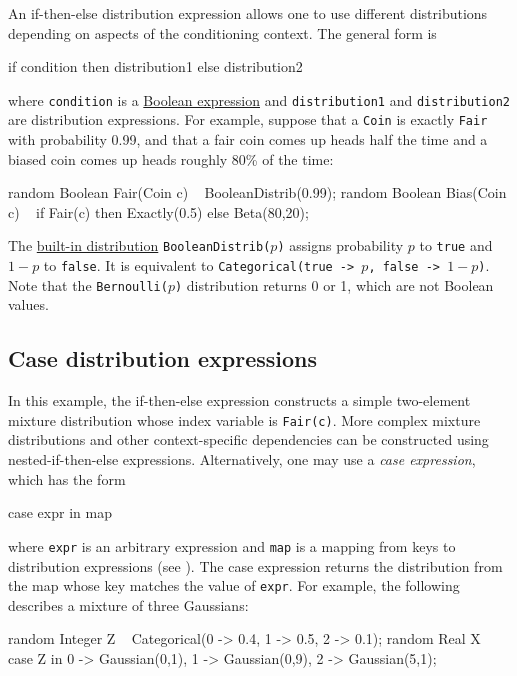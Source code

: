 \documentclass[12pt]{article}
\begin{document}
An if-then-else distribution expression allows one to use different distributions depending on aspects of the conditioning context.
The general form is
\begin{blogcode}
if condition then distribution1 else distribution2
\end{blogcode}
where \texttt{condition} is a \hyperref[Boolean-expression-section]{Boolean expression} and \texttt{distribution1} and \texttt{distribution2}
are distribution expressions. For example, suppose that a {\tt Coin} is exactly {\tt Fair} with probability 0.99, and that
a fair coin comes up heads half the time and a biased coin comes up heads roughly 80\% of the time:
\begin{blogcode}
random Boolean Fair(Coin c) ~ BooleanDistrib(0.99);
random Boolean Bias(Coin c) ~  
  if Fair(c) then Exactly(0.5) else Beta(80,20);
\end{blogcode}
The \hyperref[builtin-distribution-appendix]{built-in distribution}
{\tt BooleanDistrib($p$)} assigns probability $p$ to {\tt true} and
$1-p$ to {\tt false}. It is equivalent to {\tt Categorical({true ->
    $p$, false -> $1-p$})}. Note that the {\tt Bernoulli($p$)}
distribution returns 0 or 1, which are not Boolean values.


\subsection{Case distribution expressions}\label{case-distribution-section}

In this example, the if-then-else expression constructs a simple two-element mixture distribution whose
index variable is {\tt Fair(c)}. More complex mixture distributions and other context-specific dependencies
can be constructed using nested-if-then-else expressions. Alternatively, one may
use a {\em case expression}, which has the form
\begin{blogcode}
case expr in map
\end{blogcode}
where {\tt expr} is an arbitrary expression and {\tt map} is a mapping from keys to distribution expressions (see ).
The case expression returns the distribution from the map whose key matches the value of {\tt expr}.
For example, the following describes a mixture of three Gaussians:
\begin{blogcode}
random Integer Z ~ Categorical({0 -> 0.4, 1 -> 0.5, 2 -> 0.1});
random Real X ~ case Z in {0 -> Gaussian(0,1), 1 -> Gaussian(0,9), 2 -> Gaussian(5,1)};
\end{blogcode}
\end{document}

